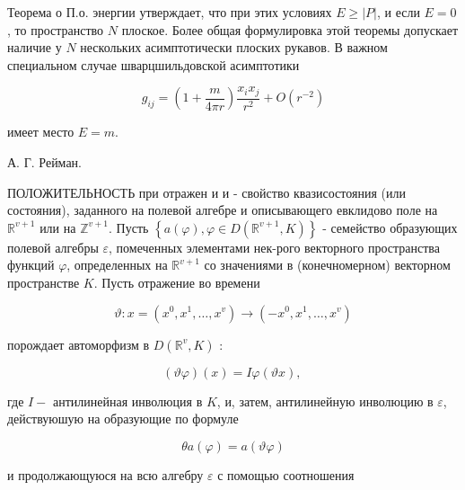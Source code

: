 \documentclass[10pt]{article}
\begin{document}
Теорема о П.о. энергии утверждает, что при этих условиях $E \geqslant|P|$, и если $E=0$, то пространство $N$ плоское. Более общая формулировка этой теоремы допускает наличие у $N$ нескольких асимптотически плоских рукавов. В важном специальном случае шварцшильдовской асимптотики



\[

g_{i j}=\left(1+\frac{m}{4 \pi r}\right) \frac{x_{i} x_{j}}{r^{2}}+O\left(r^{-2}\right)

\]



имеет место $E=m$.



А. Г. Рейман.



ПОЛОЖИТЕЛЬНОСТЬ при отражен и и - свойство квазисостояния (или состояния), заданного на полевой алгебре и описывающего евклидово поле на $\mathbb{R}^{v+1}$ или на $\mathbb{Z}^{v+1}$. Пусть $\left\{a(\varphi), \varphi \in D\left(\mathbb{R}^{v+1}, K\right)\right\}$ - семейство образующих полевой алгебры $\varepsilon$, помеченных элементами нек-рого векторного пространства функций $\varphi$, определенных на $\mathbb{R}^{v+1}$ со значениями в (конечномерном) векторном пространстве $K$. Пусть отражение во времени



\[

\vartheta: x=\left(x^{0}, x^{1}, \ldots, x^{v}\right) \rightarrow\left(-x^{0}, x^{1}, \ldots, x^{v}\right)

\]



порождает автоморфизм в $D\left(\mathbb{R}^{v}, K\right)$ :



\[

(\vartheta \varphi)(x)=I \varphi(\vartheta x) \text {, }

\]



где $I-$ антилинейная инволюция в $K$, и, затем, антилинейную инволюцию в $\varepsilon$, действуюшую на образующие по формуле



\[

\theta a(\varphi)=a(\vartheta \varphi)

\]



и продолжающуюся на всю алгебру $\varepsilon$ с помощью соотношения
\end{document}
